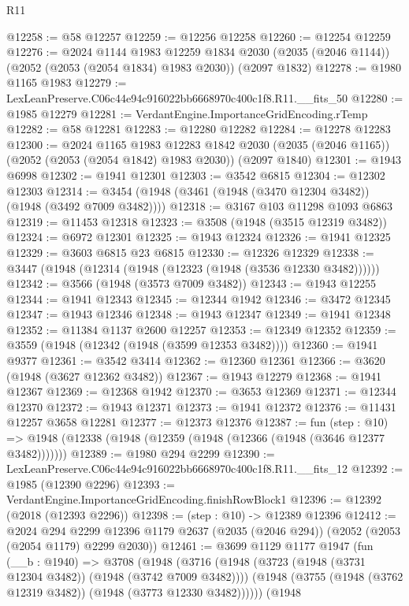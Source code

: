 \begin{lexlean}{R11}
\begin{coremodule}
@12258 := @58 @12257
@12259 := @12256 @12258
@12260 := @12254 @12259
@12276 := @2024
    @1144
    @1983
    @12259
    @1834
    @2030
    (@2035 (@2046 @1144))
    (@2052 (@2053 (@2054 @1834) @1983 @2030))
    (@2097 @1832)
@12278 := @1980 @1165 @1983
@12279 := LexLeanPreserve.C06c44e94c916022bb6668970c400c1f8.R11.__fits_50
@12280 := @1985 @12279
@12281 := VerdantEngine.ImportanceGridEncoding.rTemp
@12282 := @58 @12281
@12283 := @12280 @12282
@12284 := @12278 @12283
@12300 := @2024
    @1165
    @1983
    @12283
    @1842
    @2030
    (@2035 (@2046 @1165))
    (@2052 (@2053 (@2054 @1842) @1983 @2030))
    (@2097 @1840)
@12301 := @1943 @6998
@12302 := @1941 @12301
@12303 := @3542 @6815
@12304 := @12302 @12303
@12314 := @3454 (@1948 (@3461 (@1948 (@3470 @12304 @3482)) (@1948 (@3492 @7009 @3482))))
@12318 := @3167 @103 @11298 @1093 @6863
@12319 := @11453 @12318
@12323 := @3508 (@1948 (@3515 @12319 @3482))
@12324 := @6972 @12301
@12325 := @1943 @12324
@12326 := @1941 @12325
@12329 := @3603 @6815 @23 @6815
@12330 := @12326 @12329
@12338 := @3447 (@1948 (@12314 (@1948 (@12323 (@1948 (@3536 @12330 @3482))))))
@12342 := @3566 (@1948 (@3573 @7009 @3482))
@12343 := @1943 @12255
@12344 := @1941 @12343
@12345 := @12344 @1942
@12346 := @3472 @12345
@12347 := @1943 @12346
@12348 := @1943 @12347
@12349 := @1941 @12348
@12352 := @11384 @1137 @2600 @12257
@12353 := @12349 @12352
@12359 := @3559 (@1948 (@12342 (@1948 (@3599 @12353 @3482))))
@12360 := @1941 @9377
@12361 := @3542 @3414
@12362 := @12360 @12361
@12366 := @3620 (@1948 (@3627 @12362 @3482))
@12367 := @1943 @12279
@12368 := @1941 @12367
@12369 := @12368 @1942
@12370 := @3653 @12369
@12371 := @12344 @12370
@12372 := @1943 @12371
@12373 := @1941 @12372
@12376 := @11431 @12257 @3658 @12281
@12377 := @12373 @12376
@12387 := fun (step : @10) =>
  @1948 (@12338 (@1948 (@12359 (@1948 (@12366 (@1948 (@3646 @12377 @3482)))))))
@12389 := @1980 @294 @2299
@12390 := LexLeanPreserve.C06c44e94c916022bb6668970c400c1f8.R11.__fits_12
@12392 := @1985 (@12390 @2296)
@12393 := VerdantEngine.ImportanceGridEncoding.finishRowBlock1
@12396 := @12392 (@2018 (@12393 @2296))
@12398 := (step : @10) -> @12389 @12396
@12412 := @2024
    @294
    @2299
    @12396
    @1179
    @2637
    (@2035 (@2046 @294))
    (@2052 (@2053 (@2054 @1179) @2299 @2030))
@12461 := @3699
    @1129
    @1177
    @1947
    (fun (__b : @1940) =>
    @3708
      (@1948
        (@3716
          (@1948 (@3723 (@1948 (@3731 @12304 @3482)) (@1948 (@3742 @7009 @3482))))
          (@1948 (@3755 (@1948 (@3762 @12319 @3482)) (@1948 (@3773 @12330 @3482))))))
      (@1948

\end{coremodule}
\end{lexlean}
